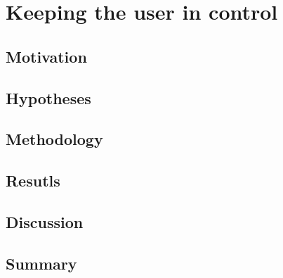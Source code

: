\chapter{Keeping the user in control}\label{chap:control}

\section{Motivation}

\section{Hypotheses}

\section{Methodology}

\section{Resutls}

\section{Discussion}

\section{Summary}

